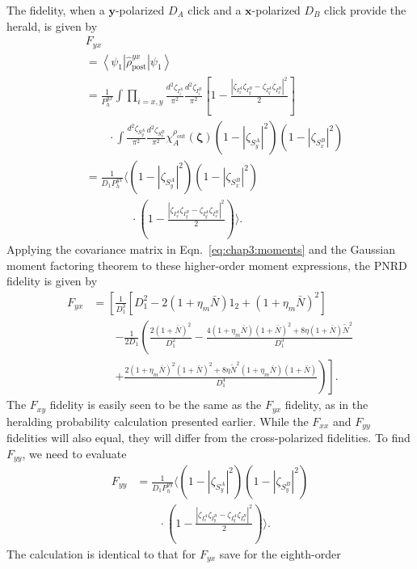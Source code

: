 \documentclass[aps,twocolumn,secnumarabic,amsmath,amssymb,pra,groupedaddress,
showpacs, showkeys,draft]{revtex4-1}
\newcommand{\bra}[1]{\left\langle #1 \right|}
\newcommand{\ket}[1]{\left|#1\right\rangle}
\newcommand{\pna}[1]{\left(#1\right)}
\newcommand{\pnb}[1]{\left[#1\right]}
\begin{document}
The fidelity, when a $\mathbf{y}$-polarized $D_A$ click and a
$\mathbf{x}$-polarized $D_B$ click provide the herald, is given by
\begin{align}
& F_{yx} \nonumber \\
& = \bra{\psi_{1}} \hat{\rho}_{\textrm{post}}^{yx} \ket{\psi_1} \nonumber \\
& =\frac{1}{P_{h}^{yx}}\int 
\prod_{i=x,y}\frac{d^2 \zeta_{I_i^A}}{\pi^2} 
\frac{d^2 \zeta_{I_i^B}}{\pi^2} 
\pnb{1-\frac{|\zeta_{I_x^A}\zeta_{I_y^B}-\zeta_{I_y^A}\zeta_{I_x^B}|^2}{2}}  \nonumber \\
& \qquad \cdot \int 
\frac{d^2 \zeta_{S_y^A}}{\pi^2} 
\frac{d^2 \zeta_{S_x^B}}{\pi^2}
\chi_A^{\rho_{\textrm{out}}}\pna{\bm{\zeta}} 
\pna{1-|\zeta_{S_y^A}|^2}\pna{1-|\zeta_{S_x^B}|^2} \nonumber \\
& = \frac{1}{D_1 P_{h}^{yx}}\langle
\pna{1-|\zeta_{S_y^A}|^2}\pna{1-|\zeta_{S_x^B}|^2}\nonumber \\ 
& \qquad \qquad \cdot \pna{1-\frac{|\zeta_{I_x^A}\zeta_{I_y^B}-\zeta_{I_y^A}\zeta_{I_x^B}|^2}{2}}  \rangle.
\end{align}
Applying the covariance matrix in Eqn.~\ref{eq:chap3:moments} and the Gaussian
moment factoring theorem to these higher-order moment expressions, the PNRD
fidelity is given by
\begin{align}
F_{yx}&=\left[\frac{1}{D_1^3}\pnb{D_1^2-2\pna{1+\eta_{m}\bar{N}}1_2+\pna{1+\eta_{m}\bar{N}}^2}\right.\nonumber\\
& \qquad \left.-\frac{1}{2D_1} \left(\frac{2\pna{1+\bar{N}}^2}{D_1^2}-\frac{4\pna{1+\eta_{m}\bar{N}}\pna{1+\bar{N}}^2+8\eta\pna{1+\bar{N}}\tilde{N}^2}{D_1^3}\right.\right.\nonumber\\
& \qquad \left.\left.+\frac{2\pna{1+\eta_{m}\bar{N}}^2\pna{1+\bar{N}}^2 +8 \eta \tilde{N}^2 \pna{1 + \eta_{m} \bar{N}} \pna{1 + \bar{N}}}{D_1^4}\right)\right].
\end{align}
The $F_{xy}$ fidelity is easily seen to be the same as the $F_{yx}$ fidelity,
as in the heralding probability calculation presented earlier. While the
$F_{xx}$ and $F_{yy}$ fidelities will also equal, they will differ from the
cross-polarized fidelities. To find $F_{yy}$, we need to evaluate
\begin{align}
F_{yy} & = \frac{1}{D_1 P_{h}^{yy}}\langle
\pna{1-|\zeta_{S_y^A}|^2}\pna{1-|\zeta_{S_y^B}|^2}\nonumber \\ & \qquad \cdot\pna{1-\frac{|\zeta_{I_x^A}\zeta_{I_y^B}-\zeta_{I_y^A}\zeta_{I_x^B}|^2}{2}}  \rangle.
\end{align}
The calculation is identical to that for $F_{yx}$ save for the eighth-order
\end{document}
